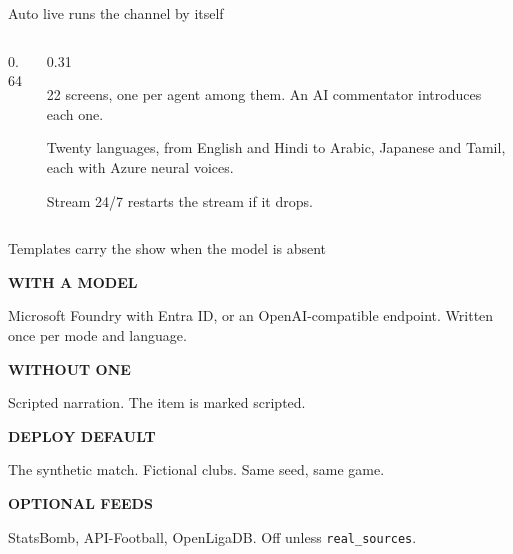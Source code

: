 \documentclass[aspectratio=169,11pt,t]{beamer}
\begin{document}
\begin{frame}{Auto live runs the channel by itself}
  \begin{columns}[T,onlytextwidth]
    \begin{column}{0.64\textwidth}
    \end{column}
    \begin{column}{0.31\textwidth}
      {\small 22 screens, one per agent among them. An AI commentator introduces each one.\par}
      \vspace{2mm}
      {\small Twenty languages, from English and Hindi to Arabic, Japanese and Tamil, each with Azure neural voices.\par}
      \vspace{2mm}
      {\small\color{triadMuted} Stream 24/7 restarts the stream if it drops.\par}
    \end{column}
  \end{columns}
\end{frame}

\begin{frame}{Templates carry the show when the model is absent}
  \begin{minipage}[t]{0.48\textwidth}
    \begin{triadcard}[equal height group=src]
      \vspace{1mm}
      {\bfseries\footnotesize WITH A MODEL\par}
      {\small Microsoft Foundry with Entra ID, or an OpenAI-compatible endpoint. Written once per mode and language.\par}
      \vspace{1.2mm}
      {\bfseries\footnotesize WITHOUT ONE\par}
      {\small Scripted narration. The item is marked scripted.\par}
    \end{triadcard}
  \end{minipage}\hfill
  \begin{minipage}[t]{0.48\textwidth}
    \begin{triadcard}[equal height group=src]
      \vspace{1mm}
      {\bfseries\footnotesize DEPLOY DEFAULT\par}
      {\small The synthetic match. Fictional clubs. Same seed, same game.\par}
      \vspace{1.2mm}
      {\bfseries\footnotesize OPTIONAL FEEDS\par}
      {\small StatsBomb, API-Football, OpenLigaDB. Off unless \texttt{real\_sources}.\par}
    \end{triadcard}
  \end{minipage}
\end{frame}
\end{document}

